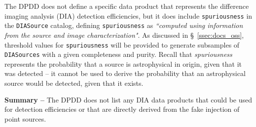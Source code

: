 \documentclass[DM,lsstdraft,toc]{lsstdoc}
\begin{document}
The DPDD  does not define a specific data product that represents the difference imaging analysis (DIA) detection efficiencies, but it does include {\tt spuriousness} in the {\tt DIASource} catalog, defining {\tt spuriousness} as {\it ``computed using information from the source and image characterization"}. As discussed in \S~\ref{ssec:docs_oss}, threshold values for {\tt spuriousness} will be provided to generate subsamples of {\tt DIASources} with a given completeness and purity. Recall that {\it spuriousness} represents the probability that a source is astrophysical in origin, given that it was detected -- it cannot be used to derive the probability that an astrophysical source would be detected, given that it exists.

{\bf Summary --} The DPDD does not list any DIA data products that could be used for detection efficiencies or that are directly derived from the fake injection of point sources.

\end{document}
